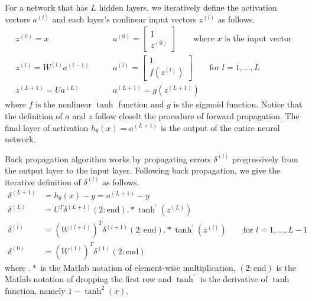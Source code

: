 \documentclass[letterpaper]{article}
\begin{document}
For a network that has $L$ hidden layers, we iteratively define the activation vectors $a^{(l)}$ and each layer's nonlinear input vectors $z^{(l)}$ as follows.
\begin{equation}
\begin{split}
z^{(0)} = x
& \qquad 
a^{(0)} =
\begin{bmatrix}
1 \\ z^{(0)}
\end{bmatrix} 
\qquad
\textrm{where } x \textrm{ is the input vector} \\
z^{(l)} = W^{(l)} a^{(l-1)}
& \qquad
a^{(l)} = 
\begin{bmatrix}
1 \\ f(z^{(l)})
\end{bmatrix}
\qquad
\textrm{for } l = 1, \dots, L \\
z^{(L+1)} = U a^{(L)}
& \qquad
a^{(L+1)} = g(z^{(L+1)})
\end{split}
\end{equation}
where $f$ is the nonlinear $\tanh$ function and $g$ is the sigmoid function. Notice that the definition of $a$ and $z$ follow closelt the procedure of forward propagation. The final layer of activation $h_\theta(x) = a^{(L+1)}$ is the output of the entire neural network.

\vspace{0.1cm}

Back propagation algorithm works by propagating errors $\delta^{(l)}$ progressively from the output layer to the input layer. Following back propagation, we give the iterative definition of $\delta^{(l)}$ as follows.
\begin{equation}
\begin{split}
\delta^{(L+1)} &= h_\theta(x) - y = a^{(L+1)} - y \\
\delta^{(L)} &= U^T \delta^{(L+1)}(2:\textrm{end}).* \tanh^\prime (z^{(L)}) \\
\delta^{(l)} &= (W^{(l+1)})^T \delta^{(l+1)} (2:\textrm{end}) .* \tanh^\prime
(z^{(l)}) \qquad \textrm{for } l = 1, \dots, L-1 \\
\delta^{(0)} & = (W^{(1)})^T \delta^{(1)} (2:\textrm{end})
\end{split}
\end{equation}
where $.*$ is the Matlab notation of element-wise multiplication, $(2:\textrm{end})$ is the Matlab notation of dropping the first row and $\tanh^\prime$ is the derivative of $\tanh$ function, namely $1 - \tanh^2(x)$.

\vspace{0.1cm}
\end{document}
